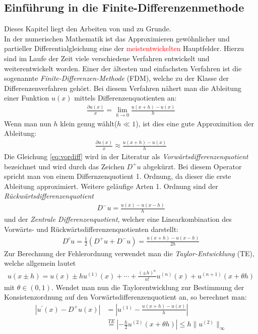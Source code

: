\documentclass[a4paper,11pt]{article}
\newcommand{\col}[2][red]{\textcolor{#1}{#2}}
\begin{document}
\subsection{Einführung in die Finite-Differenzenmethode}
Dieses Kapitel liegt den Arbeiten von \cite{burger2006numerik} und \cite{braess2013finite} zu Grunde.\\
In der numerischen Mathematik ist das Approximieren gewöhnlicher und partieller Differentialgleichung eine der \col{meistentwickelten} Hauptfelder. Hierzu sind im Laufe der Zeit viele verschiedene Verfahren entwickelt und weiterentwickelt worden. Einer der ältesten  und einfachsten Verfahren ist die sogenannte \textit{Finite-Differenzen-Methode} (FDM), welche zu der Klasse der Differenzenverfahren gehört. Bei diesem Verfahren nähert man die Ableitung einer Funktion $u(x)$ mittels Differenzenquotienten an:
\begin{align}
 \frac{\partial u(x)}{x}=\lim\limits_{h \rightarrow 0} \frac{u(x+h)-u(x)}{h}
\end{align}
Wenn man nun $h$ klein genug wählt($h\ll1$), ist dies eine gute Approximition der Ableitung:
\begin{align}
 \frac{\partial u(x)}{x}\approx \frac{u(x+h)-u(x)}{h}\label{eq:vordiff}
\end{align}
Die Gleichung \eqref{eq:vordiff} wird in der Literatur als \textit{Vorwärtsdifferenzenquotient} bezeichnet und wird durch das Zeichen $D^+u$ abgekürzt. Bei diesem Operator spricht man von einem Differnzenquotient 1. Ordnung, da dieser die erste Ableitung approximiert. Weitere geläufige Arten 1. Ordnung sind der \textit{Rückwärtsdifferenzenquotient}
\begin{align}
 D^-u= \frac{u(x)-u(x-h)}{h}
\end{align}
und der \textit{Zentrale Differenzenquotient}, welcher eine Linearkombination des Vorwärts- und Rückwärtsdifferenzenquotienten darstellt:
\begin{align}
 D^cu=\frac{1}{2}(D^+u+D^-u)= \frac{u(x+h)-u(x-h)}{2h}
\end{align}
Zur Berechnung der Fehlerordnung verwendet man die \textit{Taylor-Entwicklung} (TE), welche allgemein lautet
\begin{align}
 u(x\pm h)=u(x)\pm hu^{(1)}(x)+\cdots+\frac{(\pm h)^n}{n!}u^{(n)}(x)+u^{(n+1)}(x+\theta h)
\end{align}
mit $\theta\in(0,1)$. Wendet man nun die Taylorentwicklung zur Bestimmung der Konsistenzordnung auf den Vorwärtsdifferenzenquotient an, so berechnet man:
\begin{align}
 |u^{'}(x)-D^+u(x)|&=|u^{(1)}-\frac{u(x+h)-u(x)}{h}|\nonumber\\&\overset{TE}{=}|-\frac{h}{2}u^{(2)}(x+\theta h)|\le h\|u^{(2)}\|_{\infty}
\end{align}
\end{document}
